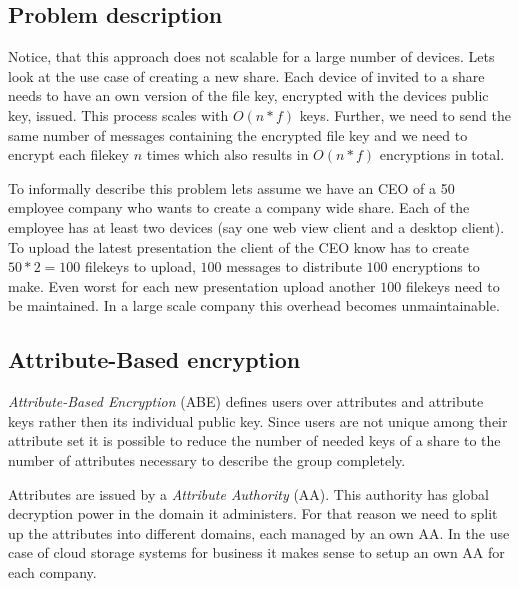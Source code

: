 \subsection{Problem description}

Notice, that this approach does not scalable for a large number of devices. Lets look at the use case of creating a new share. Each device of invited to a share needs to have an own version of the file key, encrypted with the devices public key, issued. This process scales with $O(n * f)$ keys. 
Further, we need to send the same number of messages containing the encrypted file key and we need to encrypt each filekey $n$ times which also results in $O(n * f)$ encryptions in total. 

To informally describe this problem lets assume we have an CEO of a 50 employee company who wants to create a company wide share. Each of the employee has at least two devices (say one web view client and a desktop client). To upload the latest presentation the client of the CEO know has to create $50 * 2 = 100$ filekeys to upload, $100$ messages to distribute $100$ encryptions to make. Even worst for each new presentation upload another $100$ filekeys need to be maintained. In a large scale company this overhead becomes unmaintainable.

\subsection{Attribute-Based encryption}
\textit{Attribute-Based Encryption} (\ac{ABE}) defines users over attributes and attribute keys rather then its individual public key. Since users are not unique among their attribute set it is possible to reduce the number of needed keys of a share to the number of attributes necessary to describe the group completely. 

Attributes are issued by a \textit{Attribute Authority} (\ac{AA}). This authority has global decryption power in the domain it administers. For that reason we need to split up the attributes into different domains, each managed by an own AA. In the use case of cloud storage systems for business it makes sense to setup an own AA for each company.

